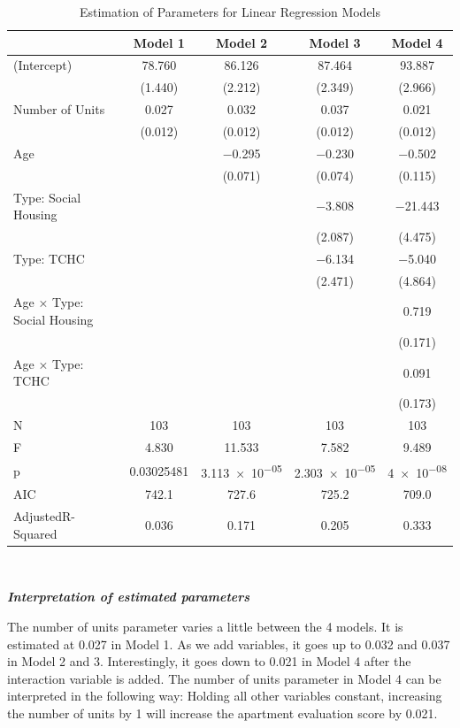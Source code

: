 \documentclass[
]{article}
\begin{document}
\begin{table}[!h]

\caption{\label{tab:unnamed-chunk-7}Estimation of Parameters for Linear Regression Models}
\centering
\begin{tabular}[t]{lcccc}
\toprule
  & Model 1 & Model 2 & Model 3 & Model 4\\
\midrule
(Intercept) & \num{78.760} & \num{86.126} & \num{87.464} & \num{93.887}\\
 & (\num{1.440}) & (\num{2.212}) & (\num{2.349}) & (\num{2.966})\\
Number of Units & \num{0.027} & \num{0.032} & \num{0.037} & \num{0.021}\\
 & (\num{0.012}) & (\num{0.012}) & (\num{0.012}) & (\num{0.012})\\
Age &  & \num{-0.295} & \num{-0.230} & \num{-0.502}\\
 &  & (\num{0.071}) & (\num{0.074}) & (\num{0.115})\\
Type: Social Housing &  &  & \num{-3.808} & \num{-21.443}\\
 &  &  & (\num{2.087}) & (\num{4.475})\\
Type: TCHC &  &  & \num{-6.134} & \num{-5.040}\\
 &  &  & (\num{2.471}) & (\num{4.864})\\
Age × Type: Social Housing &  &  &  & \num{0.719}\\
 &  &  &  & (\num{0.171})\\
Age × Type: TCHC &  &  &  & \num{0.091}\\
 &  &  &  & (\num{0.173})\\
\midrule
N & \num{103} & \num{103} & \num{103} & \num{103}\\
F & \num{4.830} & \num{11.533} & \num{7.582} & \num{9.489}\\
p & \num{0.03025481} & \num{3.113e-05} & \num{2.303e-05} & \num{4e-08}\\
AIC & \num{742.1} & \num{727.6} & \num{725.2} & \num{709.0}\\
AdjustedR-Squared & \num{0.036} & \num{0.171} & \num{0.205} & \num{0.333}\\
\bottomrule
\end{tabular}
\end{table}

~

\textbf{\emph{Interpretation of estimated parameters}}

The number of units parameter varies a little between the 4 models. It
is estimated at 0.027 in Model 1. As we add variables, it goes up to
0.032 and 0.037 in Model 2 and 3. Interestingly, it goes down to 0.021
in Model 4 after the interaction variable is added. The number of units
parameter in Model 4 can be interpreted in the following way: Holding
all other variables constant, increasing the number of units by 1 will
increase the apartment evaluation score by 0.021.
\end{document}
